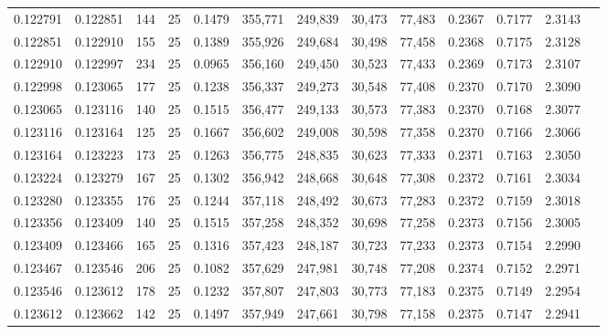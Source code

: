 \begin{tabular}{rrrrrrrrrrrrr}
0.122791 & 0.122851 &   144 &  25 &                                     0.1479 & 355,771 & 249,839 &  30,473 &  77,483 & 0.2367 & 0.7177 & 2.3143 \\
0.122851 & 0.122910 &   155 &  25 &                                     0.1389 & 355,926 & 249,684 &  30,498 &  77,458 & 0.2368 & 0.7175 & 2.3128 \\
0.122910 & 0.122997 &   234 &  25 &                                     0.0965 & 356,160 & 249,450 &  30,523 &  77,433 & 0.2369 & 0.7173 & 2.3107 \\
0.122998 & 0.123065 &   177 &  25 &                                     0.1238 & 356,337 & 249,273 &  30,548 &  77,408 & 0.2370 & 0.7170 & 2.3090 \\
0.123065 & 0.123116 &   140 &  25 &                                     0.1515 & 356,477 & 249,133 &  30,573 &  77,383 & 0.2370 & 0.7168 & 2.3077 \\
0.123116 & 0.123164 &   125 &  25 &                                     0.1667 & 356,602 & 249,008 &  30,598 &  77,358 & 0.2370 & 0.7166 & 2.3066 \\
0.123164 & 0.123223 &   173 &  25 &                                     0.1263 & 356,775 & 248,835 &  30,623 &  77,333 & 0.2371 & 0.7163 & 2.3050 \\
0.123224 & 0.123279 &   167 &  25 &                                     0.1302 & 356,942 & 248,668 &  30,648 &  77,308 & 0.2372 & 0.7161 & 2.3034 \\
0.123280 & 0.123355 &   176 &  25 &                                     0.1244 & 357,118 & 248,492 &  30,673 &  77,283 & 0.2372 & 0.7159 & 2.3018 \\
0.123356 & 0.123409 &   140 &  25 &                                     0.1515 & 357,258 & 248,352 &  30,698 &  77,258 & 0.2373 & 0.7156 & 2.3005 \\
0.123409 & 0.123466 &   165 &  25 &                                     0.1316 & 357,423 & 248,187 &  30,723 &  77,233 & 0.2373 & 0.7154 & 2.2990 \\
0.123467 & 0.123546 &   206 &  25 &                                     0.1082 & 357,629 & 247,981 &  30,748 &  77,208 & 0.2374 & 0.7152 & 2.2971 \\
0.123546 & 0.123612 &   178 &  25 &                                     0.1232 & 357,807 & 247,803 &  30,773 &  77,183 & 0.2375 & 0.7149 & 2.2954 \\
0.123612 & 0.123662 &   142 &  25 &                                     0.1497 & 357,949 & 247,661 &  30,798 &  77,158 & 0.2375 & 0.7147 & 2.2941 \\

\end{tabular}

